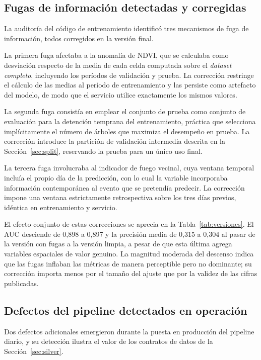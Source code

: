 \documentclass[11pt,a4paper]{article}
\begin{document}
\subsection{Fugas de información detectadas y corregidas}
\label{sec:fugas}

La auditoría del código de entrenamiento identificó tres mecanismos de fuga
de información, todos corregidos en la versión final.

La primera fuga afectaba a la anomalía de NDVI, que se calculaba como
desviación respecto de la media de cada celda computada sobre el
\emph{dataset completo}, incluyendo los períodos de validación y prueba. La
corrección restringe el cálculo de las medias al período de entrenamiento y
las persiste como artefacto del modelo, de modo que el servicio utilice
exactamente los mismos valores.

La segunda fuga consistía en emplear el conjunto de prueba como conjunto de
evaluación para la detención temprana del entrenamiento, práctica que
selecciona implícitamente el número de árboles que maximiza el desempeño en
prueba. La corrección introduce la partición de validación intermedia
descrita en la Sección~\ref{sec:split}, reservando la prueba para un único
uso final.

La tercera fuga involucraba al indicador de fuego vecinal, cuya ventana
temporal incluía el propio día de la predicción, con lo cual la variable
incorporaba información contemporánea al evento que se pretendía predecir.
La corrección impone una ventana estrictamente retrospectiva sobre los tres
días previos, idéntica en entrenamiento y servicio.

El efecto conjunto de estas correcciones se aprecia en la
Tabla~\ref{tab:versiones}. El AUC desciende de 0,898 a 0,897 y la precisión
media de 0,315 a 0,304 al pasar de la versión con fugas a la versión
limpia, a pesar de que esta última agrega variables espaciales de valor
genuino. La magnitud moderada del descenso indica que las fugas inflaban
las métricas de manera perceptible pero no dominante; su corrección importa
menos por el tamaño del ajuste que por la validez de las cifras publicadas.

\subsection{Defectos del pipeline detectados en operación}
\label{sec:defectos}

Dos defectos adicionales emergieron durante la puesta en producción del
pipeline diario, y su detección ilustra el valor de los contratos de datos
de la Sección~\ref{sec:silver}.
\end{document}
